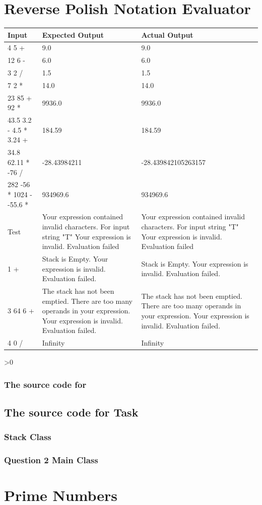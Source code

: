 \documentclass[12pt,a4paper,onesided]{report}
\newcommand{\source}{\pagebreak
	\ifnum\value{section}>0
		\subsection{The source code for \thesection}

	\else
		\section{The source code for Task \thechapter}

	\fi
	}
\begin{document}
\chapter{Reverse Polish Notation Evaluator}
\begin{table}[h!]
	\centering
\begin{tabular}{lp{28ex}p{28ex}}
	\toprule Input & Expected Output & Actual Output\\
	\midrule
	4 5 + & 9.0 & 9.0\\
	12 6 - & 6.0 & 6.0\\
	3 2 / & 1.5 & 1.5 \\
	7 2 * & 14.0 & 14.0\\
	23 85 + 92 * & 9936.0 & 9936.0 \\
	43.5 3.2 - 4.5 * 3.24 + & 184.59 & 184.59 \\
	34.8 62.11 * -76 / & -28.43984211 & -28.439842105263157\\
	282 -56 * 1024 - -55.6 * & 934969.6 & 934969.6\\
	Test & Your expression contained invalid characters. For input string "T" Your expression is invalid. Evaluation failed& Your expression contained invalid characters. For input string "T" Your expression is invalid. Evaluation failed\\ 
	1 + & Stack is Empty. Your expression is invalid. Evaluation failed. &  Stack is Empty. Your expression is invalid. Evaluation failed.\\
	3 64 6 + & The stack has not been emptied. There are too many operands in your expression. Your expression is invalid. Evaluation failed. & The stack has not been emptied. There are too many operands in your expression. Your expression is invalid. Evaluation failed. \\
	4 0 / & Infinity & Infinity \\
	\bottomrule
\end{tabular}
\end{table}
\source
\subsection{Stack Class}

\newpage
\subsection{Question 2 Main Class}

\chapter{Prime Numbers}
\end{document}
